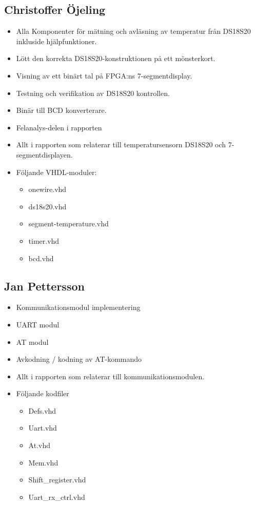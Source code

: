 \documentclass[a4paper]{scrartcl}
\begin{document}
\subsection{Christoffer Öjeling}
\begin{itemize}
	\item Alla Komponenter för mätning och avläsning av temperatur från DS18S20 inkluside hjälpfunktioner.
	\item Lött den korrekta DS18S20-konstruktionen på ett mönsterkort.
	\item Visning av ett binärt tal på FPGA:ns 7-segmentdisplay.
	\item Testning och verifikation av DS18S20 kontrollen.
	\item Binär till BCD konverterare.
	\item Felanalys-delen i rapporten
	\item Allt i rapporten som relaterar till temperatursensorn DS18S20 och 7-segmentdisplayen.
	\item Följande VHDL-moduler:
	\begin{itemize}
		\item onewire.vhd
		\item ds18s20.vhd
		\item segment-temperature.vhd
		\item timer.vhd
		\item bcd.vhd
	\end{itemize}
\end{itemize}

\subsection{Jan Pettersson}
\begin{itemize}
	\item Kommunikationsmodul implementering
	\item UART modul
	\item AT modul
	\item Avkodning / kodning av AT-kommando
	\item Allt i rapporten som relaterar till kommunikationsmodulen.
	\item Följande kodfiler
		\begin{itemize}
		\item Defs.vhd
		\item Uart.vhd
		\item At.vhd
		\item Mem.vhd
		\item Shift\_register.vhd
		\item Uart\_rx\_ctrl.vhd
		\end{itemize}
\end{itemize}
\end{document}
